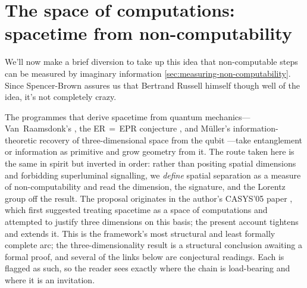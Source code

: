 \documentclass{article}
\begin{document}
\section{The space of computations: spacetime from non-computability}
\label{sec:space-of-computations}

We'll now make a brief diversion to take up this idea that non-computable steps can be measured by imaginary information \ref{sec:measuring-non-computability}.  Since Spencer-Brown assures us that Bertrand Russell himself though well of the idea,\autocite{Spence-Brown-1969} it's not completely crazy.

The programmes that derive spacetime from quantum mechanics---Van~Raamsdonk's
 \autocite{VanRaamsdonk2010}, the
ER\,$=$\,EPR conjecture \autocite{MaldacenaSusskind2013}, and M\"uller's
information-theoretic recovery of three-dimensional space from the qubit
\autocite{MuellerMasanes2013}---take entanglement or information as primitive and
grow geometry from it. The route taken here is the same in spirit but inverted in
order: rather than positing spatial dimensions and forbidding superluminal
signalling, we \emph{define} spatial separation as a measure of non-computability
and read the dimension, the signature, and the Lorentz group off the result. The
proposal originates in the author's CASYS'05 paper \autocite{small_2006}, which
first suggested treating spacetime as a space of computations and attempted to
justify three dimensions on this basis; the present account tightens and extends
it. This is the framework's most structural and least formally complete arc; the
three-dimensionality result is a structural conclusion awaiting a formal proof,
and several of the links below are conjectural readings. Each is flagged as such,
so the reader sees exactly where the chain is load-bearing and where it is an
invitation.
\end{document}
